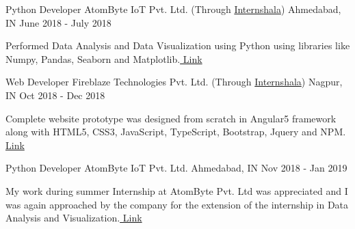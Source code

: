 

\begin{cventries}

  \cventry
    {Python Developer} %
    {AtomByte IoT Pvt. Ltd. (Through \href{https://internshala.com/student/certificate/12602917/740324C7-EA90-B04C-96B5-4E1AFAE4F912}{Internshala})} %
    {Ahmedabad, IN} %
    {June 2018 - July 2018} %
    {
      \begin{cvitems} %
        \item {Performed Data Analysis and Data Visualization using Python using libraries like Numpy, Pandas, Seaborn and Matplotlib.\href{https://drive.google.com/open?id=1kaBHedNjnz_T0Ts70zr5loajDxrinrSu}{ Link}
        }
      \end{cvitems}
    }

  \cventry
    {Web Developer} %
    {Fireblaze Technologies Pvt. Ltd. (Through \href{https://internshala.com/student/certificate/15933363/8E7554D8-A49C-3BB8-E966-C92DEBD87488}{Internshala})} %
    {Nagpur, IN} %
    {Oct 2018 - Dec 2018} %
    {
      \begin{cvitems} %
        \item {Complete website prototype was designed from scratch in Angular5 framework along with HTML5, CSS3, JavaScript, TypeScript, Bootstrap, Jquery and NPM. \href{https://drive.google.com/open?id=0B2fmTyn8UfxGV0xvd0NORWtXV1YzODBwdWh4ZzJkbHNXWmpv}{  Link}}
      \end{cvitems}
    }

   \cventry
    {Python Developer} %
    {AtomByte IoT Pvt. Ltd.} %
    {Ahmedabad, IN} %
    {Nov 2018 - Jan 2019} %
    {
      \begin{cvitems} %
        \item {My work during summer Internship at AtomByte Pvt. Ltd was appreciated and I was again approached by the company for the extension of the internship in Data Analysis and Visualization.\href{https://drive.google.com/open?id=16eaM3vPx9-oip737oujlmcCkrA6x-Yv5}{ Link}
        }
      \end{cvitems}
    }


\end{cventries}
